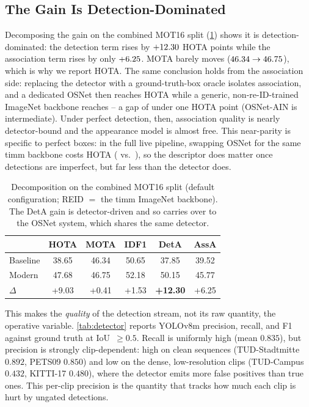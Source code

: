 \subsection{The Gain Is Detection-Dominated}
\label{sec:decomp}

Decomposing the gain on the combined MOT16 split (\cref{tab:decomp}) shows it is detection-dominated:
the detection term rises by $+12.30$ HOTA points while the association term rises by only
$+6.25$. MOTA barely moves ($46.34 \rightarrow 46.75$), which is why we report HOTA.
The same conclusion holds from the association side: replacing the detector with a ground-truth-box
oracle isolates association, and a dedicated OSNet then reaches \osnetGT{} HOTA while a generic,
non-re-ID-trained ImageNet backbone reaches \timmGT{} -- a gap of under one HOTA point
(OSNet-AIN \osnetainGT{} is intermediate). Under perfect detection, then, association quality is nearly
detector-bound and the appearance model is almost free. This near-parity is specific to perfect boxes:
in the full live pipeline, swapping OSNet for the same timm backbone costs \reidRealGap{} HOTA
(\osnetReal{} vs.\ \timmReal{}), so the descriptor does matter once detections are imperfect, but far
less than the detector does.

\begin{table}[t]
\centering
\caption{Decomposition on the combined MOT16 split (default configuration; REID $=$ the timm ImageNet
backbone). The DetA gain is detector-driven and so carries over to the OSNet system, which shares the
same detector.}
\label{tab:decomp}
\small
\begin{tabular}{lccccc}
\toprule
 & HOTA & MOTA & IDF1 & DetA & AssA \\
\midrule
Baseline & 38.65 & 46.34 & 50.65 & 37.85 & 39.52 \\
Modern   & 47.68 & 46.75 & 52.18 & 50.15 & 45.77 \\
$\Delta$ & +9.03 & +0.41 & +1.53 & \textbf{+12.30} & +6.25 \\
\bottomrule
\end{tabular}
\end{table}

This makes the \emph{quality} of the detection stream, not its raw quantity, the operative variable.
\cref{tab:detector} reports YOLOv8m precision, recall, and F1 against ground truth at
IoU~$\geq 0.5$. Recall is uniformly high (mean $0.835$), but precision is strongly clip-dependent:
high on clean sequences (TUD-Stadtmitte $0.892$, PETS09 $0.850$) and low on the dense, low-resolution
clips (TUD-Campus $0.432$, KITTI-17 $0.480$), where the detector emits more false positives
than true ones. This per-clip precision is the quantity that tracks how much each clip is hurt by
ungated detections.


